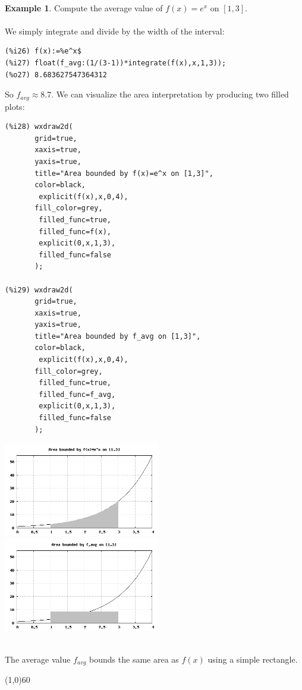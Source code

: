\documentclass[10.5pt,twoside]{report}
\theoremstyle{definition}
\newtheorem{exmp}{Example}[section]
\begin{document}
${ }$\\

\begin{exmp} Compute the average value of $f(x)=e^x$ on $[1,3]$.\\
${}$\\

We simply integrate and divide by the width of the interval:

\begin{verbatim}
(%i26) f(x):=%e^x$
(%i27) float(f_avg:(1/(3-1))*integrate(f(x),x,1,3));
(%o27) 8.683627547364312
\end{verbatim}

So $f_{avg} \approx 8.7$.  We can visualize the area interpretation by producing two filled plots:

\begin{verbatim}
(%i28) wxdraw2d(
       grid=true,
       xaxis=true,
       yaxis=true,
       title="Area bounded by f(x)=e^x on [1,3]",
       color=black,
        explicit(f(x),x,0,4),
       fill_color=grey,
        filled_func=true,
        filled_func=f(x),
        explicit(0,x,1,3),
        filled_func=false
       );

(%i29) wxdraw2d(
       grid=true,
       xaxis=true,
       yaxis=true,
       title="Area bounded by f_avg on [1,3]",
       color=black,
        explicit(f(x),x,0,4),
       fill_color=grey,
        filled_func=true,
        filled_func=f_avg,
        explicit(0,x,1,3),
        filled_func=false
       );
\end{verbatim}

\includegraphics[width=2.7in]{example_7_4_3_1}
\includegraphics[width=2.7in]{example_7_4_3_2}

${   }$\\

The average value $f_{avg}$ bounds the same area as $f(x)$ using a simple rectangle.


\end{exmp}
\line(1,0){60}
\linethickness{0.5mm}
\end{document}

